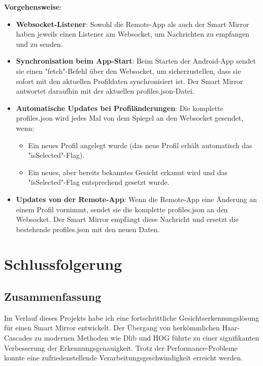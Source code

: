 \textbf{Vorgehensweise}:
\begin{itemize}
    \item \textbf{Websocket-Listener}: Sowohl die Remote-App als auch der Smart Mirror haben jeweils einen Listener am Websocket, um Nachrichten zu empfangen und zu senden.
    
    \item \textbf{Synchronisation beim App-Start}: Beim Starten der Android-App sendet sie einen "fetch"-Befehl über den Websocket, um sicherzustellen, dass sie sofort mit den aktuellen Profildaten synchronisiert ist. Der Smart Mirror antwortet daraufhin mit der aktuellen profiles.json-Datei.

    \item \textbf{Automatische Updates bei Profiländerungen}: Die komplette profiles.json wird jedes Mal von dem Spiegel an den Websocket gesendet, wenn:
    \begin{itemize}
        \item Ein neues Profil angelegt wurde (das neue Profil erhält automatisch das "isSelected"-Flag).
        \item Ein neues, aber bereits bekanntes Gesicht erkannt wird und das "isSelected"-Flag entsprechend gesetzt wurde.
    \end{itemize}

    \item \textbf{Updates von der Remote-App}: Wenn die Remote-App eine Änderung an einem Profil vornimmt, sendet sie die komplette profiles.json an den Websocket. Der Smart Mirror empfängt diese Nachricht und ersetzt die bestehende profiles.json mit den neuen Daten.
\end{itemize}

\section{Schlussfolgerung}

\subsection{Zusammenfassung}
Im Verlauf dieses Projekts habe ich eine fortschrittliche Gesichtserkennungslösung für einen Smart Mirror entwickelt. Der Übergang von herkömmlichen Haar-Cascades zu modernen Methoden wie Dlib und HOG führte zu einer signifikanten Verbesserung der Erkennungsgenauigkeit. Trotz der Performance-Probleme konnte eine zufriedenstellende Verarbeitungsgeschwindigkeit erreicht werden.


